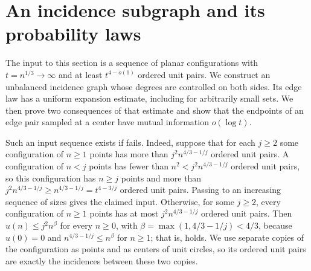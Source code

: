 \section{An incidence subgraph and its probability laws}\label{sec:incidence}

The input to this section is a sequence of planar configurations with
\(t=n^{1/3}\to\infty\) and at least \(t^{4-o(1)}\) ordered unit pairs.
We construct an unbalanced incidence graph whose degrees are controlled
on both sides. Its edge law has a uniform expansion estimate, including
for arbitrarily small sets. We then prove two consequences of that
estimate and show that the endpoints of an edge pair sampled at a center have
mutual information \(o(\log t)\).

Such an input sequence exists if  fails. Indeed, suppose
that for each \(j\ge2\) some configuration of \(n\ge1\) points has more
than \(j^2n^{4/3-1/j}\) ordered unit pairs. A configuration of \(n<j\)
points has fewer than \(n^2<j^2n^{4/3-1/j}\) ordered unit pairs, so this
configuration has \(n\ge j\) points and more than
\(j^2n^{4/3-1/j}\ge n^{4/3-1/j}=t^{4-3/j}\) ordered unit pairs. Passing
to an increasing sequence of sizes gives the claimed input. Otherwise,
for some \(j\ge2\), every configuration of \(n\ge1\) points has at most
\(j^2n^{4/3-1/j}\) ordered unit pairs. Then \(u(n)\le j^2n^\beta\) for
every \(n\ge0\), with \(\beta=\max(1,4/3-1/j)<4/3\), because \(u(0)=0\)
and \(n^{4/3-1/j}\le n^\beta\) for \(n\ge1\); that is, 
holds. We use separate copies of the configuration as
points and as centers of unit circles, so its ordered unit pairs are
exactly the incidences between these two copies.

